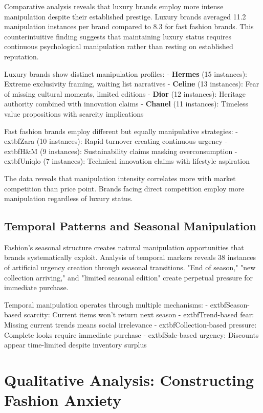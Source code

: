 Comparative analysis reveals that luxury brands employ more intense manipulation despite their established prestige. Luxury brands averaged 11.2 manipulation instances per brand compared to 8.3 for fast fashion brands. This counterintuitive finding suggests that maintaining luxury status requires continuous psychological manipulation rather than resting on established reputation.

Luxury brands show distinct manipulation profiles:
- \textbf{Hermes} (15 instances): Extreme exclusivity framing, waiting list narratives
- \textbf{Celine} (13 instances): Fear of missing cultural moments, limited editions
- \textbf{Dior} (12 instances): Heritage authority combined with innovation claims
- \textbf{Chanel} (11 instances): Timeless value propositions with scarcity implications

Fast fashion brands employ different but equally manipulative strategies:
- 	extbf{Zara} (10 instances): Rapid turnover creating continuous urgency
- 	extbf{H&M} (9 instances): Sustainability claims masking overconsumption
- 	extbf{Uniqlo} (7 instances): Technical innovation claims with lifestyle aspiration

The data reveals that manipulation intensity correlates more with market competition than price point. Brands facing direct competition employ more manipulation regardless of luxury status.

\subsection{Temporal Patterns and Seasonal Manipulation}

Fashion's seasonal structure creates natural manipulation opportunities that brands systematically exploit. Analysis of temporal markers reveals 38 instances of artificial urgency creation through seasonal transitions. "End of season," "new collection arriving," and "limited seasonal edition" create perpetual pressure for immediate purchase.

Temporal manipulation operates through multiple mechanisms:
- 	extbf{Season-based scarcity}: Current items won't return next season
- 	extbf{Trend-based fear}: Missing current trends means social irrelevance
- 	extbf{Collection-based pressure}: Complete looks require immediate purchase
- 	extbf{Sale-based urgency}: Discounts appear time-limited despite inventory surplus

\section{Qualitative Analysis: Constructing Fashion Anxiety}
\label{sec:fashion_qual}


